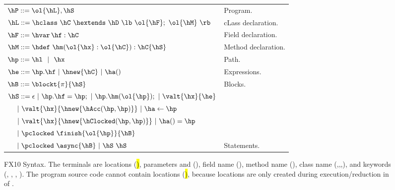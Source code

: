 \begin{figure*}[t]
\begin{center}
\begin{tabular}{|l|l|}
\hline

$\hP ::= \ol{\hL},\hS$ & Program. \\

$\hL ::= \hclass ~ \hC~\hextends~\hD~\lb~\ol{\hF};~\ol{\hM}~\rb$
& cLass declaration. \\

$\hF ::= \hvar\,\hf:\hC$
& Field declaration. \\

$\hM ::= \hdef\ \hm(\ol{\hx}:\ol{\hC}):\hC\{\hS\}$
& Method declaration. \\

$\hp ::= \hl ~~|~~ \hx$
& Path. \\ %

$\he ::=  \hp.\hf  ~|~ \hnew{\hC} ~|~ \ha()$
& Expressions. \\ %
$\hB ::= \blockt{\pi}{\hS}$
& Blocks. \\
$\hS ::=  \epsilon ~|~\hp.\hf = \hp; ~|~ \hp.\hm(\ol{\hp});  ~|~ \valt{\hx}{\he}$ &\\
$~~~~|~\valt{\hx}{\hnew{\hAcc(\hp,\hp)}} ~|~ \ha \leftarrow \hp$ &\\
$~~~~|~\valt{\hx}{\hnew{\hClocked(\hp,\hp)}} ~|~ \ha() = \hp$ &\\
$~~~~|~ \pclocked~\finish{\ol{\hp}}{\hB}$&\\
$~~~~|~ \pclocked~\async{\hB}~|~ \hS~\hS$
& Statements. \\ %

\hline
\end{tabular}
\end{center}
FX10 Syntax.
    The terminals are locations (\hl), parameters and \hthis (\hx), field name (\hf), method name (\hm), class name (\hB,\hC,\hD,\hObject),
        and keywords (\hhnew, \hfinish, \hasync, ).
    The program source code cannot contain locations (\hl), because locations are only created during execution/reduction in  of .

\label{Figure:syntax}



\end{figure*}
